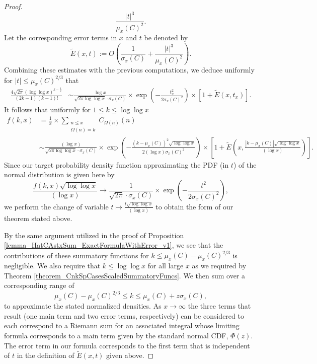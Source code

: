 \documentclass[11pt,reqno,a4letter]{article}
\numberwithin{figure}{section}
\numberwithin{table}{section}
\theoremstyle{plain}
\numberwithin{theorem}{section}
\theoremstyle{definition}
\begin{document}
\begin{proof}
\[     \frac{|t|^3}{\mu_x(C)^2}. 
\] 
Let the corresponding error terms in $x$ and $t$ be denoted by 
\[
\widetilde{E}(x, t) := O\left(\frac{1}{\sigma_x(C)} + \frac{|t|^3}{\mu_x(C)^2}\right). 
\]
Combining these estimates with the previous computations, we deduce 
uniformly for $|t| \leq \mu_x(C)^{2/3}$ that 
\begin{align*} 
\frac{4\sqrt{2\pi} (\log\log x)^{k-\frac{1}{2}}}{(2k-1)(k-1)!} & \sim 
     \frac{\log x}{\sqrt{2\pi \log\log x} \cdot \sigma_x(C)} 
     \times \exp\left(-\frac{t_x^2}{2\sigma_x(C)^2}\right) \times 
     \left[1 + \widetilde{E}(x, t_x)\right]. 
\end{align*} 
It follows that uniformly for $1 \leq k \leq \log\log x$ 
\begin{align*}
f(k, x) & = 
     \frac{1}{x} \times \sum_{\substack{n \leq x \\ \Omega(n)=k}} C_{\Omega(n)}(n) \\ 
     & \sim 
     \frac{(\log x)}{\sqrt{2\pi \log\log x} \cdot \sigma_x(C)} 
     \times \exp\left(-\frac{(k-\mu_x(C))^2 \sqrt{\log\log x}}{2 (\log x) \sigma_x(C)^2}\right) \times 
     \left[1 + \widetilde{E}\left(x, \frac{|k - \mu_x(C)| \sqrt{\log\log x}}{(\log x)}\right)\right]. 
\end{align*}
Since our target probability density function approximating the PDF (in $t$) of the 
normal distribution is given here by 
$$\frac{f(k, x) \sqrt{\log\log x}}{(\log x)} 
  \rightarrow \frac{1}{\sqrt{2\pi} \cdot \sigma_x(C)} \times \exp\left(-\frac{t^2}{2
  \sigma_x(C)^2}\right),$$ 
we perform the change of variable $t \mapsto \frac{t \sqrt{\log\log x}}{(\log x)}$ to obtain the 
form of our theorem stated above. 

By the same argument utilized in the proof of 
Proposition \ref{lemma_HatCAstxSum_ExactFormulaWithError_v1}, we see that 
the contributions of these summatory functions for 
$k \leq \mu_x(C) - \mu_x(C)^{2/3}$ is negligible. 
We also require that $k \leq \log\log x$ for all large $x$ as we required by 
Theorem \ref{theorem_CnkSpCasesScaledSummatoryFuncs}. We then sum over a 
corresponding range of 
\[
\mu_x(C) -\mu_x(C)^{2/3} \leq k \leq \mu_x(C) + z \sigma_x(C), 
\] 
to approximate the stated normalized densities. 
As $x \rightarrow \infty$ the 
three terms that result (one main term and two error terms, respectively) 
can be considered to each correspond to a Riemann sum for an associated integral whose 
limiting formula corresponds to a main term given by the standard normal CDF, $\Phi(z)$. 
The error term in our formula corresponds to the first term that is independent of $t$ in the 
definition of $\widetilde{E}(x, t)$ given above. 
\end{proof} 
\end{document}
